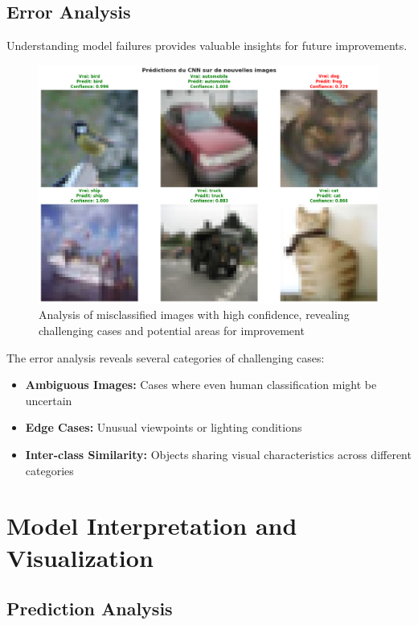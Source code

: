 \documentclass[11pt,a4paper]{article}
\begin{document}
\subsection{Error Analysis}

Understanding model failures provides valuable insights for future improvements.

\begin{figure}[H]
    \centering
    \includegraphics[width=\textwidth]{tp2_cnn_img/cell_23_output_00_image_07.png}
    \caption{Analysis of misclassified images with high confidence, revealing challenging cases and potential areas for improvement}
    \label{fig:error_analysis}
\end{figure}

The error analysis reveals several categories of challenging cases:

\begin{itemize}
    \item \textbf{Ambiguous Images:} Cases where even human classification might be uncertain
    \item \textbf{Edge Cases:} Unusual viewpoints or lighting conditions
    \item \textbf{Inter-class Similarity:} Objects sharing visual characteristics across different categories
\end{itemize}

\section{Model Interpretation and Visualization}

\subsection{Prediction Analysis}
\end{document}
